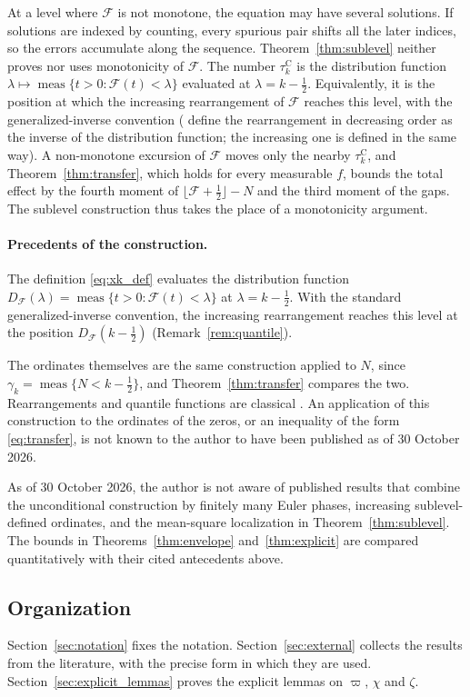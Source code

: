 \documentclass[11pt,a4paper]{article}
\makeatletter
\numberwithin{equation}{section}
\DeclareRobustCommand{\CGref}[1]{\ref{#1}}
\DeclareRobustCommand{\CGeqref}[1]{\eqref{#1}}
\DeclareRobustCommand{\CGcite}[2][]{\if\relax\detokenize{#1}\relax\cite{#2}\else\cite[#1]{#2}\fi}
\let\CG@origref\ref
\let\CG@origeqref\eqref
\newcommand{\CG@gettip}[1]{\@ifundefined{CGTip@#1}{#1}{\csname CGTip@#1\endcsname}}
\newcommand{\CG@getbib}[1]{\@ifundefined{CGBib@#1}{#1}{\csname CGBib@#1\endcsname}}
\DeclareRobustCommand{\CGref}[1]{\pdftooltip{\CG@origref{#1}}{\CG@gettip{#1}}}
\DeclareRobustCommand{\CGeqref}[1]{\pdftooltip{\CG@origeqref{#1}}{\CG@gettip{#1}}}
\DeclareRobustCommand{\CGcite}[2][]{\pdftooltip{\if\relax\detokenize{#1}\relax\cite{#2}\else\cite[#1]{#2}\fi}{\CG@getbib{#2}}}
\theoremstyle{definition}
\theoremstyle{remark}
\newcommand{\Fc}{\mathcal F}
\newcommand{\meas}{\operatorname{meas}}
\makeatother
\begin{document}
At a level where $\Fc$ is not monotone, the equation may have several solutions. If solutions are indexed by counting, every spurious pair shifts all the later indices, so the errors accumulate along the sequence. Theorem~\CGref{thm:sublevel} neither proves nor uses monotonicity of $\Fc$. The number $\tau_{k}^{\mathrm C}$ is the distribution function $\lambda\mapsto\meas\{t>0:\Fc(t)<\lambda\}$ evaluated at $\lambda=k-\frac12$. Equivalently, it is the position at which the increasing rearrangement of $\Fc$ reaches this level, with the generalized-inverse convention (\CGcite[\S10.12]{HardyLittlewoodPolya1934} define the rearrangement in decreasing order as the inverse of the distribution function; the increasing one is defined in the same way). A non-monotone excursion of $\Fc$ moves only the nearby $\tau_{k}^{\mathrm C}$, and Theorem~\CGref{thm:transfer}, which holds for every measurable $f$, bounds the total effect by the fourth moment of $\lfloor\Fc+\frac12\rfloor-N$ and the third moment of the gaps. The sublevel construction thus takes the place of a monotonicity argument.

\paragraph{Precedents of the construction.}
The definition \CGeqref{eq:xk_def} evaluates the distribution function $D_{\Fc}(\lambda)=\meas\{t>0:\Fc(t)<\lambda\}$ at $\lambda=k-\frac12$. With the standard generalized-inverse convention, the increasing rearrangement reaches this level at the position $D_{\Fc}(k-\frac12)$ (Remark~\CGref{rem:quantile}).

The ordinates themselves are the same construction applied to $N$, since $\gamma_k=\meas\{N<k-\frac12\}$, and Theorem~\CGref{thm:transfer} compares the two. Rearrangements and quantile functions are classical \CGcite[Ch.~X]{HardyLittlewoodPolya1934}. An application of this construction to the ordinates of the zeros, or an inequality of the form \CGeqref{eq:transfer}, is not known to the author to have been published as of 30 October 2026.

As of 30 October 2026, the author is not aware of published results that combine the unconditional construction by finitely many Euler phases, increasing sublevel-defined ordinates, and the mean-square localization in Theorem~\CGref{thm:sublevel}. The bounds in Theorems~\CGref{thm:envelope} and~\CGref{thm:explicit} are compared quantitatively with their cited antecedents above.

\subsection{Organization}
Section~\CGref{sec:notation} fixes the notation. Section~\CGref{sec:external} collects the results from the literature, with the precise form in which they are used. Section~\CGref{sec:explicit_lemmas} proves the explicit lemmas on $\varpi$, $\chi$ and $\zeta$.
\end{document}
